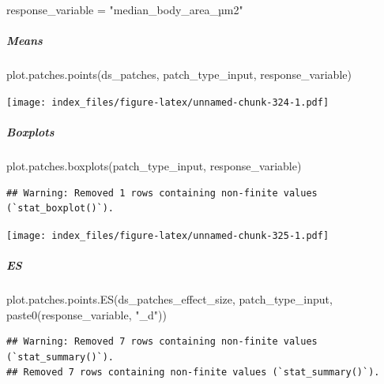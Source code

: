 \documentclass[
]{article}
\newenvironment{Shaded}{\begin{snugshade}}{\end{snugshade}}
\newcommand{\FunctionTok}[1]{\textcolor[rgb]{0.00,0.00,0.00}{#1}}
\newcommand{\NormalTok}[1]{#1}
\newcommand{\OtherTok}[1]{\textcolor[rgb]{0.56,0.35,0.01}{#1}}
\newcommand{\StringTok}[1]{\textcolor[rgb]{0.31,0.60,0.02}{#1}}
\begin{document}
\begin{Shaded}
\begin{Highlighting}[]
\NormalTok{response\_variable }\OtherTok{=} \StringTok{"median\_body\_area\_µm2"}
\end{Highlighting}
\end{Shaded}

\hypertarget{means-25}{%
\subparagraph{Means}\label{means-25}}

\begin{Shaded}
\begin{Highlighting}[]
\FunctionTok{plot.patches.points}\NormalTok{(ds\_patches, patch\_type\_input,}
\NormalTok{                       response\_variable)}
\end{Highlighting}
\end{Shaded}

\texttt{[image: index\_files/figure-latex/unnamed-chunk-324-1.pdf]}

\hypertarget{boxplots-23}{%
\subparagraph{Boxplots}\label{boxplots-23}}

\begin{Shaded}
\begin{Highlighting}[]
\FunctionTok{plot.patches.boxplots}\NormalTok{(patch\_type\_input,}
\NormalTok{                       response\_variable)}
\end{Highlighting}
\end{Shaded}

\begin{verbatim}
## Warning: Removed 1 rows containing non-finite values (`stat_boxplot()`).
\end{verbatim}

\texttt{[image: index\_files/figure-latex/unnamed-chunk-325-1.pdf]}

\hypertarget{es-7}{%
\subparagraph{ES}\label{es-7}}

\begin{Shaded}
\begin{Highlighting}[]
\FunctionTok{plot.patches.points.ES}\NormalTok{(ds\_patches\_effect\_size, patch\_type\_input,}
                       \FunctionTok{paste0}\NormalTok{(response\_variable, }\StringTok{"\_d"}\NormalTok{))}
\end{Highlighting}
\end{Shaded}

\begin{verbatim}
## Warning: Removed 7 rows containing non-finite values (`stat_summary()`).
## Removed 7 rows containing non-finite values (`stat_summary()`).
\end{verbatim}
\end{document}
